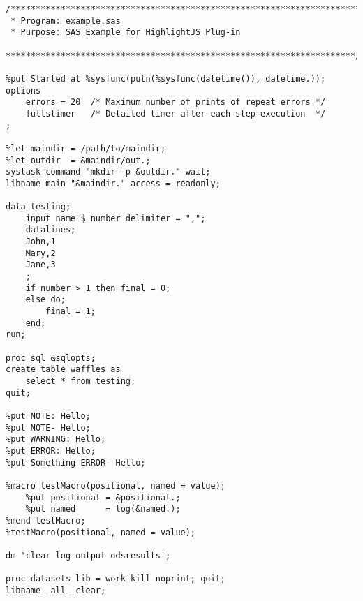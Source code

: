 \documentclass[11pt]{article}
\begin{document}
\begin{verbatim}
/**********************************************************************
 * Program: example.sas
 * Purpose: SAS Example for HighlightJS Plug-in
 **********************************************************************/

%put Started at %sysfunc(putn(%sysfunc(datetime()), datetime.));
options
    errors = 20  /* Maximum number of prints of repeat errors */
    fullstimer   /* Detailed timer after each step execution  */
;

%let maindir = /path/to/maindir;
%let outdir  = &maindir/out.;
systask command "mkdir -p &outdir." wait;
libname main "&maindir." access = readonly;

data testing;
    input name $ number delimiter = ",";
    datalines;
    John,1
    Mary,2
    Jane,3
    ;
    if number > 1 then final = 0;
    else do;
        final = 1;
    end;
run;

proc sql &sqlopts;
create table waffles as
    select * from testing;
quit;

%put NOTE: Hello;
%put NOTE- Hello;
%put WARNING: Hello;
%put ERROR: Hello;
%put Something ERROR- Hello;

%macro testMacro(positional, named = value);
    %put positional = &positional.;
    %put named      = log(&named.);
%mend testMacro;
%testMacro(positional, named = value);

dm 'clear log output odsresults';

proc datasets lib = work kill noprint; quit;
libname _all_ clear;

\end{verbatim}
\end{document}
